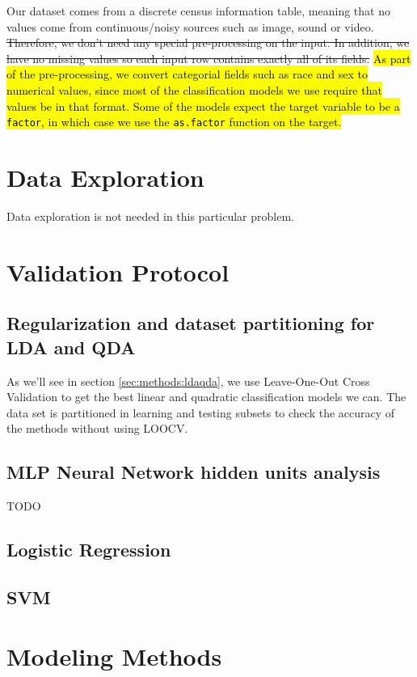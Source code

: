 \documentclass[english]{scrartcl}
\newcommand\ms[1]{\texttt{#1}}
\newcommand\R[1]{\texttt{#1}}
\begin{document}
Our dataset comes from a discrete census information table, meaning that no values come from continuous/noisy sources such as image, sound or video. \st{Therefore, we don't need any special pre-processing on the input. In addition, 
we have no missing values so each input row contains exactly all of its fields.} \hl{As part of the pre-processing, we convert categorial fields such as race and sex to numerical values, since most of the classification models we use require that values be in that format. Some of the models expect the target variable to be a \ms{factor}, in which case we use the \R{as.factor} function on the target.}

\section{Data Exploration}

Data exploration is not needed in this particular problem.

\section{Validation Protocol}

    \subsection{Regularization and dataset partitioning for LDA and QDA}
    As we'll see in section \ref{sec:methods:ldaqda}, we use Leave-One-Out Cross Validation to get the best linear and quadratic classification models we 
    can. The data set is partitioned in learning and testing subsets to check the accuracy of the methods without using LOOCV.
    
    \subsection{MLP Neural Network hidden units analysis}
    TODO
    
    \subsection{Logistic Regression}    
    
    \subsection{SVM}

\section{Modeling Methods}
\end{document}
